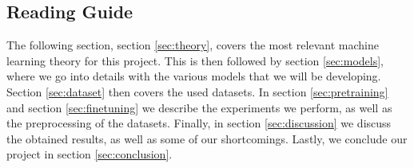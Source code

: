 \documentclass[./main.tex]{subfiles}
\begin{document}
\subsection{Reading Guide}
The following section, section \ref{sec:theory}, covers the most relevant machine learning theory for this project. This is then followed by section \ref{sec:models}, where we go into details with the various models that we will be developing. Section \ref{sec:dataset} then covers the used datasets. In section \ref{sec:pretraining} and section \ref{sec:finetuning} we describe the experiments we perform, as well as the preprocessing of the datasets. Finally, in section \ref{sec:discussion} we discuss the obtained results, as well as some of our shortcomings. Lastly, we conclude our project in section \ref{sec:conclusion}.
\end{document}
